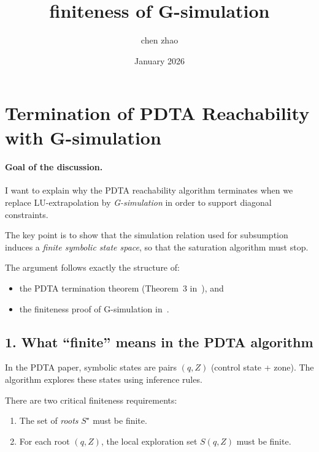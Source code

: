 \documentclass{article}
\title{finiteness of G-simulation}
\author{chen zhao}
\date{January 2026}
\begin{document}
\maketitle


\section*{Termination of PDTA Reachability with G-simulation}

\paragraph{Goal of the discussion.}
I want to explain why the PDTA reachability algorithm
terminates when we replace LU-extrapolation by
\emph{G-simulation} in order to support diagonal constraints.

The key point is to show that the simulation relation used for
subsumption induces a \emph{finite symbolic state space},
so that the saturation algorithm must stop.

\vspace{1ex}
The argument follows exactly the structure of:
\begin{itemize}
  \item the PDTA termination theorem (Theorem~3 in~\cite{PDTA}), and
  \item the finiteness proof of G-simulation in~\cite{GAbs}.
\end{itemize}


\subsection*{1. What ``finite'' means in the PDTA algorithm}

In the PDTA paper, symbolic states are pairs $(q,Z)$
(control state + zone).
The algorithm explores these states using inference rules.

There are two critical finiteness requirements:

\begin{enumerate}
  \item The set of \emph{roots} $S^\star$ must be finite.
  \item For each root $(q,Z)$, the local exploration set $S(q,Z)$
        must be finite.
\end{enumerate}
\end{document}
